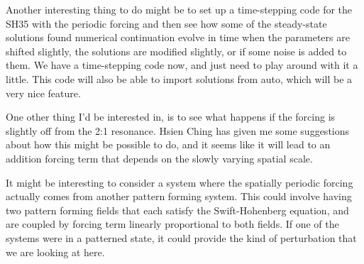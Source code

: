 \documentclass[api,pof,pre,12pt,a4paper]{revtex4-1}
\begin{document}
Another interesting thing to do might be to set up a time-stepping code for the SH35 with the periodic forcing and then see how some of the steady-state solutions found numerical continuation evolve in time when the parameters are shifted slightly, the solutions are modified slightly, or if some noise is added to them. We have a time-stepping code now, and just need to play around with it a little. This code will also be able to import solutions from auto, which will be a very nice feature.

One other thing I'd be interested in, is to see what happens if the forcing is slightly off from the 2:1 resonance. Hsien Ching has given me some suggestions about how this might be possible to do, and it seems like it will lead to an addition forcing term that depends on the slowly varying spatial scale.

It might be interesting to consider a system where the spatially periodic forcing actually comes from another pattern forming system.  This could involve having two pattern forming fields that each satisfy the Swift-Hohenberg equation, and are coupled  by  forcing term linearly proportional to both fields.  If one of the systems were in a patterned state, it could provide the kind of perturbation that we are looking at here.
    




\end{document}
